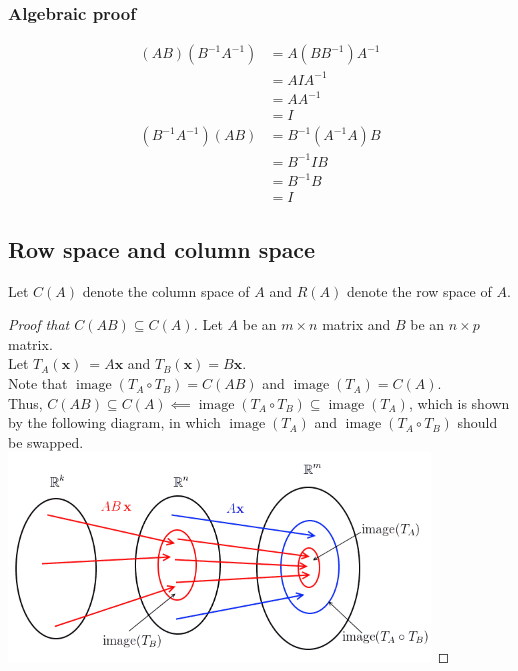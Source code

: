 \documentclass{scrartcl}
\begin{document}
\subsubsection*{Algebraic proof}
\begin{align*}
  (AB)(B^{-1}A^{-1}) &= A(BB^{-1})A^{-1}\\
                     &= AIA^{-1}\\
                     &= AA^{-1}\\
                     &= I\\
  (B^{-1}A^{-1})(AB) &= B^{-1}(A^{-1}A)B\\
                     &= B^{-1}IB\\
                     &= B^{-1}B\\
                     &= I
\end{align*}

\subsection{Row space and column space}
Let \(C(A)\) denote the column space of \(A\) and \(R(A)\) denote the row space of \(A\).

\begin{proof}[Proof that \(C(AB) \subseteq C(A)\)]
  Let \(A\) be an \(m \times n\) matrix and \(B\) be an \(n \times p\) matrix.\\
  Let \(T_A(\mathbf{x})\ = A\mathbf{x}\) and \(T_B(\mathbf{x}) = B\mathbf{x}\).\\
  Note that \(\operatorname{image}(T_A \circ T_B) = C(AB)\) and \(\operatorname{image}(T_A) = C(A)\).\\
  Thus, \(C(AB) \subseteq C(A) \impliedby \operatorname{image}(T_A \circ T_B) \subseteq \operatorname{image}(T_A)\), which is shown by the following diagram, in which \(\operatorname{image}(T_A)\) and \(\operatorname{image}(T_A \circ T_B)\) should be swapped.\\
  \includegraphics[height=15em]{column-space.png}
\end{proof}
\end{document}
